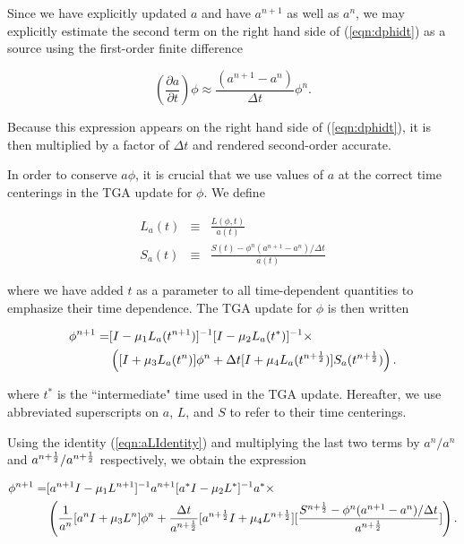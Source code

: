 \noindent
Since we have explicitly updated $a$ and have $a^{n+1}$ as well as $a^n$, 
we may explicitly estimate the second term on the right hand side of 
(\ref{eqn:dphidt}) as a source using the first-order finite difference 

\begin{equation}
\left(\frac{\partial a}{\partial t}\right) \phi \approx 
  \frac{(a^{n+1} - a^n)}{\Delta t} \phi^n.
\end{equation}

\noindent
Because this expression appears on the right hand side of (\ref{eqn:dphidt}), 
it is then multiplied by a factor of $\Delta t$ and rendered second-order 
accurate.

In order to conserve $a \phi$, it is crucial that we use values of $a$ at the 
correct time centerings in the TGA update for $\phi$. We define

\begin{eqnarray}
L_a(t) &\equiv& \frac{L(\phi, t)}{a(t)} \\
S_a(t) &\equiv& \frac{S(t) - \phi^n (a^{n+1} - a^n)/\Delta t}{a(t)}
\end{eqnarray}

\noindent
where we have added $t$ as a parameter to all time-dependent quantities to 
emphasize their time dependence. The TGA update for $\phi$ is then written

\begin{eqnarray}
\phi^{n+1} =& [I - \mu_1 L_a(t^{n+1})]^{-1}[I - \mu_2 L_a(t^*)]^{-1} \times \notag \\
            & \left([I + \mu_3 L_a(t^n)]\phi^n + 
                   \Delta t [I + \mu_4 L_a(t^{n+\frac{1}{2}})] S_a(t^{n+\frac{1}{2}})\right). \label{eqn:TimeDepTGAUpdate}
\end{eqnarray}

\noindent
where $t^*$ is the ``intermediate" time used in the TGA update. Hereafter, we
use abbreviated superscripts on $a$, $L$, and $S$ to refer to their time 
centerings.

Using the identity (\ref{eqn:aLIdentity}) and multiplying the last two terms 
by $a^n/a^n$ and $a^{n+\frac{1}{2}}/a^{n+\frac{1}{2}}$ respectively, we obtain the expression

\begin{eqnarray}
\phi^{n+1} =& [a^{n+1} I - \mu_1 L^{n+1}]^{-1}a^{n+1} 
              [a^* I - \mu_2 L^*]^{-1}a^* \times \label{eqn:expandedTimeDepTGAUpdate} \\
            & \left(\frac{1}{a^n} [a^n I + \mu_3 L^n]\phi^n + 
                    \frac{\Delta t}{a^{n+\frac{1}{2}}} [a^{n+\frac{1}{2}} I + \mu_4 L^{n+\frac{1}{2}}] 
                                                 [\frac{S^{n+\frac{1}{2}} - \phi^n (a^{n+1} - a^n)/\Delta t}{a^{n+\frac{1}{2}}}]\right). \notag 
\end{eqnarray}

